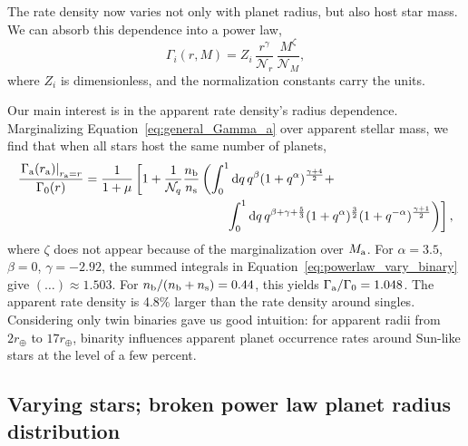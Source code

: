 \documentclass[12pt,modern]{aastex61}
\renewcommand{\a}{_{\rm a}}
\newcommand{\s}{_{\rm s}}
\renewcommand{\b}{_{\rm b}}
\begin{document}
The rate density now varies not only with planet radius, but also
host star mass.  We can absorb this dependence into a power law,
\begin{equation}
    \Gamma_i(r,M) = Z_i \, \frac{r^\gamma}{\mathcal{N}_r} \,
    \frac{M^\zeta}{\mathcal{N}_M},
\end{equation}
where $Z_i$ is dimensionless, and the normalization constants carry
the units.%

Our main interest is in the apparent rate density's radius
dependence.  Marginalizing Equation~\ref{eq:general_Gamma_a} over
apparent stellar mass, we find that when all stars host the same number
of planets,
\begin{align}
    \notag
    \frac{\left.\Gamma\a(r\a)\right|_{r\a= r}}{\Gamma_0(r)} 
    &=
    \frac{1}{1+\mu}
    \left[
      1 + \frac{1}{\mathcal{N}_q} \frac{n\b}{n\s}
    \left(
      \int_0^1 {\rm d}q\,q^\beta (1+q^\alpha)^{\frac{\gamma+4}{2}} +
      \right.
      \right. \\
      &\quad\quad\quad\quad\quad\quad\quad\quad\quad\quad\quad
      \left.\left.
      \int_0^1 {\rm d}q\,q^{\beta+\gamma+\frac{5}{3}} 
      (1+q^\alpha)^{\frac{3}{2}}
      (1+q^{-\alpha})^{\frac{\gamma+1}{2}}
    \right)
    \right],
    \label{eq:powerlaw_vary_binary}
\end{align}
where $\zeta$ does not appear because of the marginalization over
$M\a$.  For $\alpha = 3.5$, $\beta=0$, $\gamma=-2.92$, the
summed integrals in Equation~\ref{eq:powerlaw_vary_binary} give
$(\ldots)\approx 1.503$. %
For $n\b / (n\b + n\s)=0.44$, this yields $\Gamma\a/\Gamma_0 = 1.048$.
The apparent rate density is 4.8\% larger than the rate density around
singles.  Considering only twin binaries gave us good intuition: for
apparent radii from $2r_\oplus$ to $17r_\oplus$, binarity influences
apparent planet occurrence rates around Sun-like stars at the level of
a few percent.



\subsection{Varying stars; broken power law planet radius distribution}
\label{sec:model_3}
\end{document}
